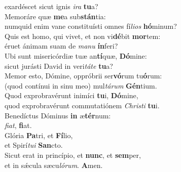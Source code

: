 \oddverse exardéscet sicut ignis \textit{i}\textit{ra} \textbf{tu}a?\\
\evenverse Memoráre quæ \textbf{me}a sub\textbf{stán}tia:~\*\\
\evenverse numquid enim vane constituísti omnes fí\textit{li}\textit{os} \textbf{hó}minum?\\
\oddverse Quis est homo, qui vivet, et non vi\textbf{dé}bit \textbf{mor}tem:~\*\\
\oddverse éruet ánimam suam de \textit{ma}\textit{nu} \textbf{ín}feri?\\
\evenverse Ubi sunt misericórdiæ tuæ an\textbf{tí}quæ, \textbf{Dó}mine:~\*\\
\evenverse sicut jurásti David in veri\textit{tá}\textit{te} \textbf{tu}a?\\
\oddverse Memor esto, Dómine, oppróbrii ser\textbf{vó}rum tu\textbf{ó}rum:~\*\\
\oddverse (quod contínui in sinu meo) mul\textit{tá}\textit{rum} \textbf{Gén}tium.\\
\evenverse Quod exprobravérunt inimíci \textbf{tu}i, \textbf{Dó}mine,~\*\\
\evenverse quod exprobravérunt commutatiónem \textit{Chri}\textit{sti} \textbf{tu}i.\\
\oddverse Benedíctus Dóminus \textbf{in} æ\textbf{tér}num:~\*\\
\oddverse \textit{fi}\textit{at}, \textbf{fi}at.\\
\evenverse Glória \textbf{Pa}tri, et \textbf{Fí}lio,~\*\\
\evenverse et Spirí\textit{tu}\textit{i} \textbf{San}cto.\\
\oddverse Sicut erat in princípio, et \textbf{nunc}, et \textbf{sem}per,~\*\\
\oddverse et in sǽcula sæcu\textit{ló}\textit{rum}. \textbf{A}men.\\
